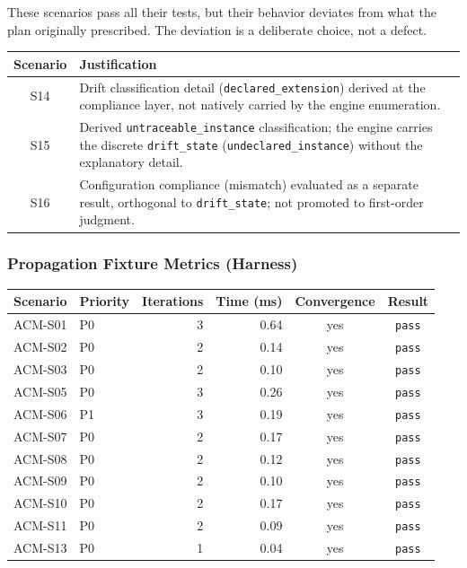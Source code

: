 \documentclass[10pt]{article}
\newcommand{\statuspass}{\textcolor{passgreen}{\texttt{pass}}}
\begin{document}
These scenarios pass all their tests, but their behavior deviates from what the plan originally prescribed. The deviation is a deliberate choice, not a defect.

\begin{table}[htbp]
	\centering
	\begin{tabular}{@{}cp{11cm}@{}}
		\toprule
		\textbf{Scenario} & \textbf{Justification} \\
		\midrule
		S14 & Drift classification detail (\texttt{declared\_extension}) derived at the compliance layer, not natively carried by the engine enumeration. \\
		\addlinespace
		S15 & Derived \texttt{untraceable\_instance} classification; the engine carries the discrete \texttt{drift\_state} (\texttt{undeclared\_instance}) without the explanatory detail. \\
		\addlinespace
		S16 & Configuration compliance (mismatch) evaluated as a separate result, orthogonal to \texttt{drift\_state}; not promoted to first-order judgment. \\
		\bottomrule
	\end{tabular}
\end{table}

\subsubsection{Propagation Fixture Metrics (Harness)}

\begin{table}[htbp]
	\centering
	\small
	\begin{tabular}{@{}clrrcc@{}}
		\toprule
		\textbf{Scenario} & \textbf{Priority} & \textbf{Iterations} & \textbf{Time (ms)} & \textbf{Convergence} & \textbf{Result} \\
		\midrule
		ACM-S01 & P0 & 3 & 0.64 & yes & \statuspass{} \\
		ACM-S02 & P0 & 2 & 0.14 & yes & \statuspass{} \\
		ACM-S03 & P0 & 2 & 0.10 & yes & \statuspass{} \\
		ACM-S05 & P0 & 3 & 0.26 & yes & \statuspass{} \\
		ACM-S06 & P1 & 3 & 0.19 & yes & \statuspass{} \\
		ACM-S07 & P0 & 2 & 0.17 & yes & \statuspass{} \\
		ACM-S08 & P0 & 2 & 0.12 & yes & \statuspass{} \\
		ACM-S09 & P0 & 2 & 0.10 & yes & \statuspass{} \\
		ACM-S10 & P0 & 2 & 0.17 & yes & \statuspass{} \\
		ACM-S11 & P0 & 2 & 0.09 & yes & \statuspass{} \\
		ACM-S13 & P0 & 1 & 0.04 & yes & \statuspass{} \\
		\bottomrule
	\end{tabular}
\end{table}
\end{document}
